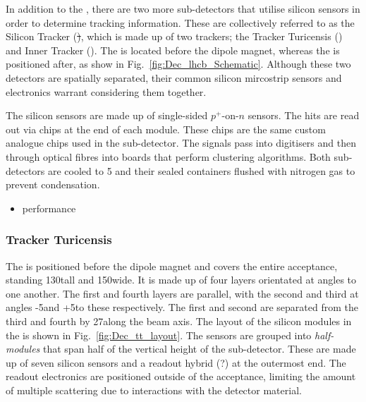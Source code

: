 In addition to the \velo, there are two more sub-detectors that utilise silicon sensors in order to determine tracking information. These are collectively referred to as the Silicon Tracker (\st), which is made up of two trackers; the Tracker Turicensis (\ttracker) and Inner Tracker (\intr). The \ttracker is located before the dipole magnet, whereas the \intr is positioned after, as show in Fig.~\ref{fig:Dec_lhcb_Schematic}. Although these two detectors are spatially separated, their common silicon mircostrip sensors and electronics warrant considering them together.

The silicon sensors are made up of single-sided $p^{+}$-on-$n$ sensors. The hits are read out via chips at the end of each module. These chips are the same custom analogue chips used in the \velo sub-detector. The signals pass into digitisers and then through optical fibres into \tellone boards that perform clustering algorithms.
Both sub-detectors are cooled to 5 and their sealed containers flushed with nitrogen gas to prevent condensation.


{\color{Red}
\begin{itemize}
\item performance
\end{itemize}
}


\subsubsection{Tracker Turicensis}

The \ttracker is positioned before the dipole magnet and covers the entire \lhcb acceptance, standing 130\cm tall and 150\cm wide.
It is made up of four layers orientated at angles to one another. The first and fourth layers are parallel, with the second and third at angles -5\degrees and +5\degrees to these respectively. The first and second are separated from the third and fourth by 27\cm along the beam axis. The layout of the silicon modules in the \ttracker is shown in Fig.~\ref{fig:Dec_tt_layout}. The sensors are grouped into \emph{half-modules} that span half of the vertical height of the sub-detector. These are made up of seven silicon sensors and a readout hybrid (?) at the outermost end. The readout electronics are positioned outside of the \lhcb acceptance, limiting the amount of multiple scattering due to interactions with the detector material. 

